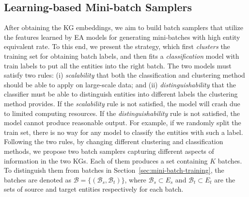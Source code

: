 \vspace{-3mm}
\subsection{Learning-based Mini-batch Samplers}


After obtaining the KG embeddings, we aim to build batch samplers that utilize the features learned by EA models for generating mini-batches with high entity equivalent rate. To this end, we present the \Sampling{} strategy, which first \emph{clusters} the training set for obtaining batch labels, and then fits a \emph{classification} model with train labels to put all the entities into the right batch. The two models must satisfy two rules: (i) \emph{scalability} that both the classification and clustering method should be able to apply on large-scale data; and (ii) \emph{distinguishability} that the classifier must be able to distinguish entities into different labels the clustering method provides. If the \emph{scalability} rule is not satisfied, the model will crash due to limited computing resources. If the \emph{distinguishability} rule is not satisfied, the model cannot produce reasonable output. For example, if we randomly split the train set, there is no way for any model to classify the entities with such a label. Following the two rules, by changing different clustering and classification methods, we propose two batch samplers capturing different aspects of information in the two KGs. Each of them produces a set
containing $K$ batches. To distinguish them from batches in Section~\ref{sec:mini-batch-training}, the batches are denoted as $\mathcal{B} = \{(\mathcal{B}_s, \mathcal{B}_t)\}$, where $\mathcal{B}_s \subset E_s$ and $\mathcal{B}_t \subset E_t$ are the sets of source and target entities respectively for each batch. 


